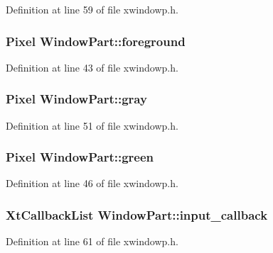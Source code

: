 Definition at line 59 of file xwindowp.\+h.

\hypertarget{structWindowPart_a73d40b151072677a7815695fe3699907}{
\subsubsection[{foreground}]{\setlength{\rightskip}{0pt plus 5cm}Pixel Window\+Part\+::foreground}}\label{structWindowPart_a73d40b151072677a7815695fe3699907}


Definition at line 43 of file xwindowp.\+h.

\hypertarget{structWindowPart_a2f2673c38a69c2359f0be2c025d80ceb}{
\subsubsection[{gray}]{\setlength{\rightskip}{0pt plus 5cm}Pixel Window\+Part\+::gray}}\label{structWindowPart_a2f2673c38a69c2359f0be2c025d80ceb}


Definition at line 51 of file xwindowp.\+h.

\hypertarget{structWindowPart_af654accb46ccf3d4d6af30c6b6f2741d}{
\subsubsection[{green}]{\setlength{\rightskip}{0pt plus 5cm}Pixel Window\+Part\+::green}}\label{structWindowPart_af654accb46ccf3d4d6af30c6b6f2741d}


Definition at line 46 of file xwindowp.\+h.

\hypertarget{structWindowPart_a031081e3a85215289cf74575f4ea8cd0}{
\subsubsection[{input\+\_\+callback}]{\setlength{\rightskip}{0pt plus 5cm}Xt\+Callback\+List Window\+Part\+::input\+\_\+callback}}\label{structWindowPart_a031081e3a85215289cf74575f4ea8cd0}


Definition at line 61 of file xwindowp.\+h.

